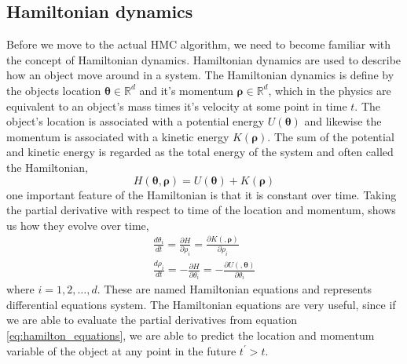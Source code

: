 \subsection{Hamiltonian dynamics}
Before we move to the actual HMC algorithm, we need to become familiar with the concept of Hamiltonian dynamics. Hamiltonian dynamics are used to describe how an object move around in a system. The Hamiltonian dynamics is define by the objects location $\boldsymbol{\theta}\in \mathbb{R}^d$ and it's momentum $\boldsymbol{\rho}\in \mathbb{R}^d$, which in the physics are equivalent to an object's mass times it's velocity at some point in time $t$. The object's location is associated with a potential energy $U(\boldsymbol{\theta})$ and likewise the momentum is associated with a kinetic energy $K(\boldsymbol{\rho})$. The sum of the potential and kinetic energy is regarded as the total energy of the system and often called the Hamiltonian,
\begin{equation*}
H(\boldsymbol{\theta},\boldsymbol{\rho})=U(\boldsymbol{\theta})+K(\boldsymbol{\rho})    
\end{equation*}       
one important feature of the Hamiltonian is that it is constant over time. Taking the partial derivative with respect to time of the location and momentum, shows us how they evolve over time,
\begin{equation}\label{eq:hamilton_equations}
\begin{split}
\frac{d \theta_{i}}{d t}=\frac{\partial H}{\partial \rho_{i}}=\frac{\partial K(,\boldsymbol{\rho})}{\partial \rho_{i}} \\
\frac{d \rho_{i}}{d t}=-\frac{\partial H}{\partial \theta_{i}}=-\frac{\partial U(,\boldsymbol{\theta})}{\partial \theta_{i}}
\end{split}
\end{equation}
where $i=1,2, \ldots,d$. These are named Hamiltonian equations and represents differential equations system. The Hamiltonian equations are very useful, since if we are able to evaluate the partial derivatives from equation \ref{eq:hamilton_equations}, we are able to predict the location and momentum variable of the object at any point in the future $t^\prime>t$.
